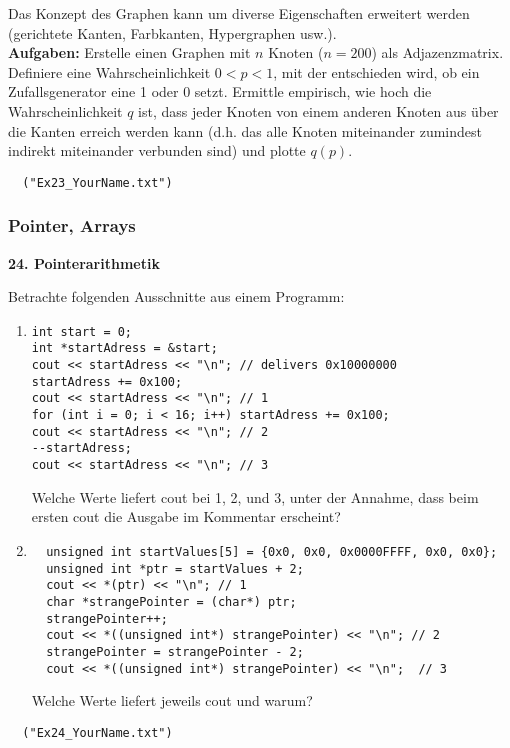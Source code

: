 \documentclass[paper=A4, pagesize, DIV=calc, smallheadings,
fontsize=11pt, expansion=false]{scrreprt}
\begin{document}
Das Konzept des Graphen kann um diverse Eigenschaften erweitert werden (gerichtete Kanten, Farbkanten, Hypergraphen usw.).\\
\textbf{Aufgaben:} 
Erstelle einen Graphen mit $n$ Knoten ($n = 200$) als Adjazenzmatrix. 
Definiere eine Wahrscheinlichkeit $0 < p < 1$, mit der entschieden wird, ob ein Zufallsgenerator eine 1 oder 0 setzt.
Ermittle empirisch, wie hoch die Wahrscheinlichkeit $q$ ist, dass jeder Knoten von einem anderen Knoten aus über die Kanten erreich werden kann (d.h. das alle Knoten miteinander zumindest indirekt miteinander verbunden sind) und plotte $q(p)$.

\begin{verbatim}
  ("Ex23_YourName.txt")
\end{verbatim} 

\subsubsection{Pointer, Arrays}

\textbf{24. Pointerarithmetik}

Betrachte folgenden Ausschnitte aus einem Programm:
    \begin{enumerate}
     \item
\begin{verbatim}
int start = 0;
int *startAdress = &start;
cout << startAdress << "\n"; // delivers 0x10000000
startAdress += 0x100;
cout << startAdress << "\n"; // 1
for (int i = 0; i < 16; i++) startAdress += 0x100;
cout << startAdress << "\n"; // 2
--startAdress;
cout << startAdress << "\n"; // 3
\end{verbatim}
    Welche Werte liefert cout bei 1, 2, und 3, unter der Annahme, dass beim ersten cout die Ausgabe im Kommentar erscheint?
  \item
\begin{verbatim}
  unsigned int startValues[5] = {0x0, 0x0, 0x0000FFFF, 0x0, 0x0};
  unsigned int *ptr = startValues + 2;
  cout << *(ptr) << "\n"; // 1
  char *strangePointer = (char*) ptr;  
  strangePointer++; 
  cout << *((unsigned int*) strangePointer) << "\n"; // 2
  strangePointer = strangePointer - 2;
  cout << *((unsigned int*) strangePointer) << "\n";  // 3
\end{verbatim}
    Welche Werte liefert jeweils cout und warum?
  \end{enumerate}
\begin{verbatim}
  ("Ex24_YourName.txt")
\end{verbatim}  
\end{document}
